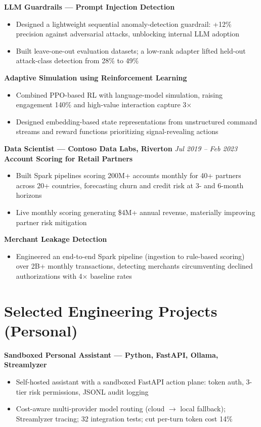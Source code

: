 \documentclass[10pt]{article}
\newcommand{\entry}[2]{\textbf{#1} \hfill \textit{#2}\\[-0.35em]}
\newcommand{\proj}[1]{\vspace{0.5pt}\textbf{#1}\\[-0.4em]}
\begin{document}
\proj{LLM Guardrails — Prompt Injection Detection}
\begin{itemize}
\item Designed a lightweight sequential anomaly-detection guardrail: +12\% precision against adversarial attacks, unblocking internal LLM adoption
\item Built leave-one-out evaluation datasets; a low-rank adapter lifted held-out attack-class detection from 28\% to 49\%
\end{itemize}

\proj{Adaptive Simulation using Reinforcement Learning}
\begin{itemize}
\item Combined PPO-based RL with language-model simulation, raising engagement 140\% and high-value interaction capture 3$\times$
\item Designed embedding-based state representations from unstructured command streams and reward functions prioritizing signal-revealing actions
\end{itemize}

\entry{Data Scientist — Contoso Data Labs, Riverton}{Jul 2019 -- Feb 2023}
\proj{Account Scoring for Retail Partners}
\begin{itemize}
\item Built Spark pipelines scoring 200M+ accounts monthly for 40+ partners across 20+ countries, forecasting churn and credit risk at 3- and 6-month horizons
\item Live monthly scoring generating \$4M+ annual revenue, materially improving partner risk mitigation
\end{itemize}

\proj{Merchant Leakage Detection}
\begin{itemize}
\item Engineered an end-to-end Spark pipeline (ingestion to rule-based scoring) over 2B+ monthly transactions, detecting merchants circumventing declined authorizations with 4$\times$ baseline rates
\end{itemize}

\section{Selected Engineering Projects (Personal)}
\proj{Sandboxed Personal Assistant — Python, FastAPI, Ollama, Streamlyzer}
\begin{itemize}
\item Self-hosted assistant with a sandboxed FastAPI action plane: token auth, 3-tier risk permissions, JSONL audit logging
\item Cost-aware multi-provider model routing (cloud $\rightarrow$ local fallback); Streamlyzer tracing; 32 integration tests; cut per-turn token cost 14\%
\end{itemize}
\end{document}
